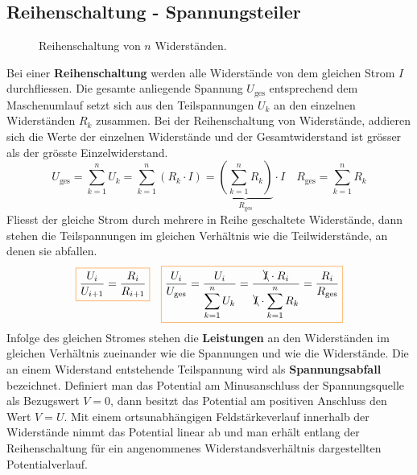 \subsection{Reihenschaltung - Spannungsteiler}
\begin{figure}[H]
\centering
\caption{Reihenschaltung von $n$ Widerständen.}
\label{fig_IIIk}
\end{figure}
Bei einer \textbf{Reihenschaltung} werden alle Widerstände von dem gleichen Strom $I$ durchfliessen. Die gesamte anliegende Spannung $U_{\text{ges}}$ entsprechend dem Maschenumlauf setzt sich aus den Teilspannungen $U_k$ an den einzelnen Widerständen $R_k$ zusammen.
\newline\newline
Bei der Reihenschaltung von Widerstände, addieren sich die Werte der einzelnen Widerstände und der Gesamtwiderstand ist grösser als der grösste Einzelwiderstand.
\begin{equation}
\boxed{U_{\text{ges}}=\displaystyle \sum_{k=1}^nU_k=\displaystyle \sum_{k=1}^n\left(R_k\cdot I\right)=\underbrace{\left(\displaystyle \sum_{k=1}^nR_k\right)}_{R_{\text{ges}}}\cdot I}\quad \boxed{R_{\text{ges}}=\displaystyle \sum_{k=1}^nR_k}
\end{equation}
Fliesst der gleiche Strom durch mehrere in Reihe geschaltete Widerstände, dann stehen die Teilspannungen im gleichen Verhältnis wie die Teilwiderstände, an denen sie abfallen.
\begin{equation}
\boxed{\dfrac{U_i}{U_{i+1}}=\dfrac{R_i}{R_{i+1}}}\quad \boxed{\dfrac{U_i}{U_{\text{ges}}}=\dfrac{U_i}{\displaystyle \sum_{k=1}^n U_k}=\dfrac{\bcancel{I}\cdot R_i}{\bcancel{I}\cdot \displaystyle \sum_{k=1}^n R_k}=\dfrac{R_i}{R_{\text{ges}}}}
\end{equation}
Infolge des gleichen Stromes stehen die \textbf{Leistungen} an den Widerständen im gleichen Verhältnis zueinander wie die Spannungen und wie die Widerstände. Die an einem Widerstand entstehende Teilspannung wird als \textbf{Spannungsabfall} bezeichnet.
\newline\newline
Definiert man das Potential am Minusanschluss der Spannungsquelle als Bezugswert $V=0$, dann besitzt das Potential am positiven Anschluss den Wert $V=U$. Mit einem ortsunabhängigen Feldstärkeverlauf innerhalb der Widerstände nimmt das Potential linear ab und man erhält entlang der Reihenschaltung für ein angenommenes Widerstandsverhältnis dargestellten Potentialverlauf.
